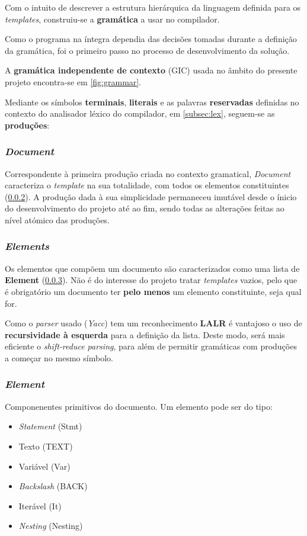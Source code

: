 \documentclass[../relatorio.tex]{subfiles}
\begin{document}
Com o intuito de descrever a estrutura hierárquica da linguagem
definida para os \textit{templates}, construiu-se a \textbf{gramática} 
a usar no compilador. 

Como o programa na íntegra dependia das decisões tomadas durante
a definição da gramática, foi o primeiro passo no processo de desenvolvimento
da solução. 

A \textbf{gramática independente de contexto} (GIC) usada 
no âmbito do presente projeto encontra-se em \ref{fig:grammar}.

Mediante os símbolos \textbf{terminais}, \textbf{literais} e as palavras 
\textbf{reservadas} definidas no contexto do analisador léxico do 
compilador, em \ref{subsec:lex}, seguem-se as \textbf{produções}:

\subsubsection{\textit{Document}}\label{grm:doc}
Correspondente à primeira produção criada no contexto gramatical,
\textit{Document} caracteriza o \textit{template} na sua totalidade,
com todos os elementos constituintes (\ref{grm:elems}).
A produção dada à sua simplicidade permaneceu imutável desde o ínicio
do desenvolvimento do projeto até ao fim, sendo todas as alterações 
feitas ao nível atómico das produções.

\subsubsection{\textit{Elements}} \label{grm:elems}
Os elementos que compõem um documento são caracterizados como uma lista 
de \textbf{Element} (\ref{grm:elem}). 
Não é do interesse do projeto tratar \textit{templates} vazios, pelo que 
é obrigatório um documento ter \textbf{pelo menos} um 
elemento constituinte, seja qual for. 

Como o \textit{parser} usado (\textit{Yacc}) tem um reconhecimento \textbf{LALR}
é vantajoso o uso de \textbf{recursividade à esquerda} para a definição da lista.
Deste modo, será mais eficiente o \textit{shift-reduce parsing}, para além
de permitir gramáticas com produções a começar no mesmo símbolo.

\subsubsection{\textit{Element}}\label{grm:elem}
Componenentes primitivos do documento. 
Um elemento pode ser do tipo:
\begin{itemize}
    \item \textit{Statement}    (Stmt)
    \item Texto                 (TEXT)
    \item Variável              (Var)
    \item \textit{Backslash}    (BACK)
    \item Iterável              (It)
    \item \textit{Nesting}      (Nesting)
\end{itemize}
\end{document}
